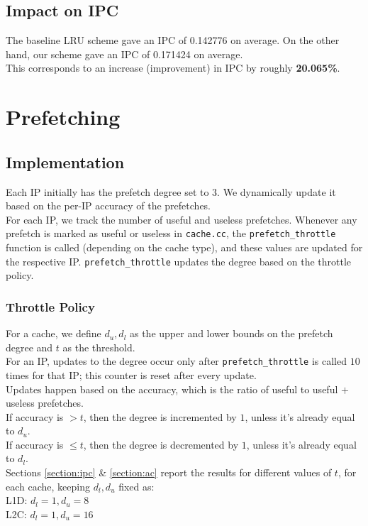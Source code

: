 \documentclass[11pt, swedish, openany]{book}
\begin{document}
\section{Impact on IPC}
The baseline LRU scheme gave an IPC of 0.142776 on average. On the other hand, our scheme gave an IPC of 0.171424 on average.\\
This corresponds to an increase (improvement) in IPC by roughly \textbf{20.065\%}.



\chapter{Prefetching}

\section{Implementation}
Each IP initially has the prefetch degree set to $3$. We dynamically update it based on the per-IP accuracy of the prefetches.\\
For each IP, we track the number of useful and useless prefetches. Whenever any prefetch is marked as useful or useless in \texttt{cache.cc}, the \texttt{prefetch\_throttle} function is called (depending on the cache type), and these values are updated for the respective IP. \texttt{prefetch\_throttle} updates the degree based on the throttle policy.

\subsection{Throttle Policy}
For a cache, we define $d_u, d_l$ as the upper and lower bounds on the prefetch degree and $t$ as the threshold. \\
For an IP, updates to the degree occur only after \texttt{prefetch\_throttle} is called $10$ times for that IP; this counter is reset after every update. \\
Updates happen based on the accuracy, which is the ratio of useful to useful $+$ useless prefetches. \\
If accuracy is $> t$, then the degree is incremented by $1$, unless it's already equal to $d_u$. \\
If accuracy is $\le t$, then the degree is decremented by $1$, unless it's already equal to $d_l$. \\
Sections \ref{section:ipc} \& \ref{section:ac} report the results for different values of $t$, for each cache, keeping $d_l, d_u$ fixed as: \\
L1D: $d_l = 1, d_u = 8$ \\
L2C: $d_l = 1, d_u = 16$
\end{document}
